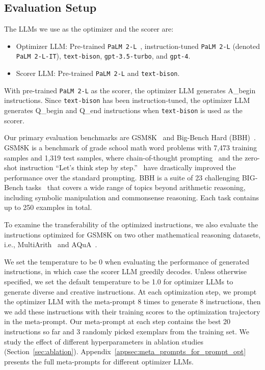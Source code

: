 \subsection{Evaluation Setup}
\label{sec:evaluation_setup}

The LLMs we use as the optimizer and the scorer are:

\begin{itemize}[leftmargin=2em,topsep=0pt,partopsep=1ex,parsep=0ex]
\item Optimizer LLM: Pre-trained \texttt{PaLM 2-L}~\citep{anil2023palm}, instruction-tuned \texttt{PaLM 2-L} (denoted \texttt{PaLM 2-L-IT}), \texttt{text-bison}, \texttt{gpt-3.5-turbo}, and \texttt{gpt-4}.
\item Scorer LLM: Pre-trained \texttt{PaLM 2-L} and \texttt{text-bison}.
\end{itemize}

With pre-trained \texttt{PaLM 2-L} as the scorer, the optimizer LLM generates A\_begin instructions.
Since \texttt{text-bison} has been instruction-tuned, the optimizer LLM generates Q\_begin and Q\_end instructions when \texttt{text-bison} is used as the scorer.

Our primary evaluation benchmarks are GSM8K~\citep{cobbe2021training} and Big-Bench Hard (BBH)~\citep{suzgun2022challenging}. GSM8K is a benchmark of grade school math word problems with 7,473 training samples and 1,319 test samples, where chain-of-thought prompting~\citep{wei2022chain} and the zero-shot instruction ``Let's think step by step.''~\citep{kojima2022large} have drastically improved the performance over the standard prompting. BBH is a suite of 23 challenging BIG-Bench tasks~\citep{srivastava2022beyond} that covers a wide range of topics beyond arithmetic reasoning, including symbolic manipulation and commonsense reasoning. Each task contains up to 250 examples in total.

To examine the transferability of the optimized instructions, we also evaluate the instructions optimized for GSM8K on two other mathematical reasoning datasets, i.e.,  MultiArith~\citep{roy2016solving} and AQuA~\citep{ling2017program}.

We set the temperature to be 0 when evaluating the performance of generated instructions, in which case the scorer LLM greedily decodes.
Unless otherwise specified, we set the default temperature to be 1.0 for optimizer LLMs to generate diverse and creative instructions.
At each optimization step, we prompt the optimizer LLM with the meta-prompt 8 times to generate 8 instructions, then we add these instructions with their training scores to the optimization trajectory in the meta-prompt.
Our meta-prompt at each step contains the best 20 instructions so far and 3 randomly picked exemplars from the training set.
We study the effect of different hyperparameters in ablation studies (Section~\ref{sec:ablation}). Appendix~\ref{appsec:meta_prompts_for_prompt_opt} presents the full meta-prompts for different optimizer LLMs.

